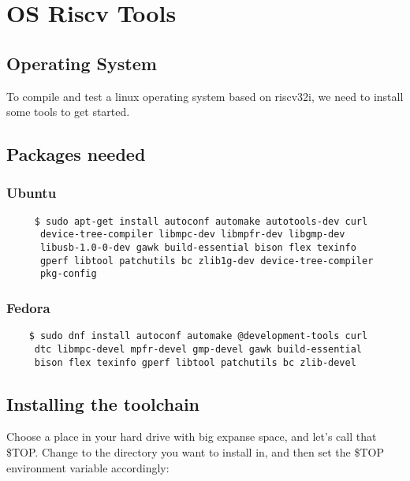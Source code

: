 
\chapter{OS Riscv Tools}

\section{Operating System}

To compile and test a linux operating system based on riscv32i, we need to install some tools to get started. 

\section{Packages needed}

\subsection{Ubuntu}
\begin{verbatim}
     $ sudo apt-get install autoconf automake autotools-dev curl 
      device-tree-compiler libmpc-dev libmpfr-dev libgmp-dev 
      libusb-1.0-0-dev gawk build-essential bison flex texinfo 
      gperf libtool patchutils bc zlib1g-dev device-tree-compiler 
      pkg-config

\end{verbatim}

\subsection{Fedora}

\begin{verbatim}
    $ sudo dnf install autoconf automake @development-tools curl
     dtc libmpc-devel mpfr-devel gmp-devel gawk build-essential 
     bison flex texinfo gperf libtool patchutils bc zlib-devel
\end{verbatim}

\section{Installing the toolchain}

Choose a place in your hard drive with big expanse space, and let's call that \$TOP.
Change to the directory you want to install in, and then set the \$TOP environment variable accordingly:

